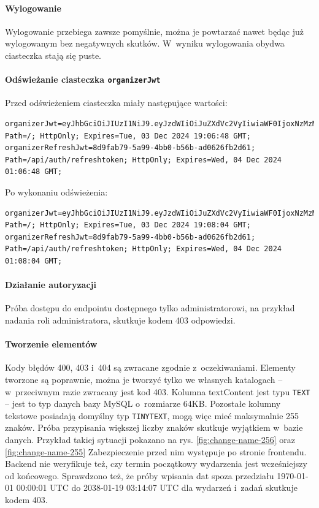 \documentclass[a4paper,twoside,12pt]{book}
\begin{document}
\paragraph{Wylogowanie}
Wylogowanie przebiega zawsze pomyślnie, można je powtarzać nawet będąc już wylogowanym bez negatywnych skutków. W~wyniku wylogowania obydwa ciasteczka stają się puste.

\paragraph{Odświeżanie ciasteczka \texttt{organizerJwt}}
Przed odświeżeniem ciasteczka miały następujące wartości:
\begin{verbatim}
organizerJwt=eyJhbGciOiJIUzI1NiJ9.eyJzdWIiOiJuZXdVc2VyIiwiaWF0IjoxNzMzMTY2NDA4LCJleHAiOjE3MzMyNTI4MDh9._JyoQNrhYdpdl3EPM8NFg29c0HwLm5nMidQ8Fh4Wsik; Path=/; HttpOnly; Expires=Tue, 03 Dec 2024 19:06:48 GMT;
organizerRefreshJwt=8d9fab79-5a99-4bb0-b56b-ad0626fb2d61; Path=/api/auth/refreshtoken; HttpOnly; Expires=Wed, 04 Dec 2024 01:06:48 GMT;
\end{verbatim}
Po wykonaniu odświeżenia:
\begin{verbatim}
organizerJwt=eyJhbGciOiJIUzI1NiJ9.eyJzdWIiOiJuZXdVc2VyIiwiaWF0IjoxNzMzMTY2NDg0LCJleHAiOjE3MzMyNTI4ODR9.ekR8DYMFlny3pKLKaunjOtXXTE3qH8dTfEFGYdaSpNs; Path=/; HttpOnly; Expires=Tue, 03 Dec 2024 19:08:04 GMT;
organizerRefreshJwt=8d9fab79-5a99-4bb0-b56b-ad0626fb2d61; Path=/api/auth/refreshtoken; HttpOnly; Expires=Wed, 04 Dec 2024 01:08:04 GMT;
\end{verbatim}

\paragraph{Działanie autoryzacji}
Próba dostępu do endpointu dostępnego tylko administratorowi, na przykład nadania roli administratora, skutkuje kodem 403 odpowiedzi.

\paragraph{Tworzenie elementów}
Kody błędów 400, 403 i~404 są zwracane zgodnie z~oczekiwaniami. Elementy tworzone są poprawnie, można je tworzyć tylko we własnych katalogach -- w~przeciwnym razie zwracany jest kod 403. Kolumna textContent jest typu \texttt{TEXT} -- jest to typ danych bazy MySQL o~rozmiarze 64KB. Pozostałe kolumny tekstowe posiadają domyślny typ \texttt{TINYTEXT}, mogą więc mieć maksymalnie 255 znaków. Próba przypisania większej liczby znaków skutkuje wyjątkiem w~bazie danych. Przykład takiej sytuacji pokazano na rys. \ref{fig:change-name-256} oraz \ref{fig:change-name-255} Zabezpieczenie przed nim występuje po stronie frontendu. Backend nie weryfikuje też, czy termin początkowy wydarzenia jest wcześniejszy od końcowego. Sprawdzono też, że próby wpisania dat spoza przedziału 1970-01-01 00:00:01 UTC do 2038-01-19 03:14:07 UTC dla wydarzeń i~zadań skutkuje kodem 403.
\end{document}
